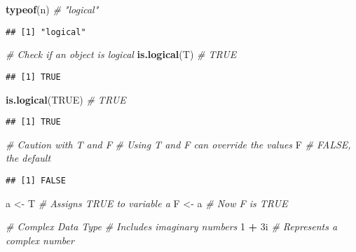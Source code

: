 \documentclass[
]{article}
\newenvironment{Shaded}{\begin{snugshade}}{\end{snugshade}}
\newcommand{\CommentTok}[1]{\textcolor[rgb]{0.56,0.35,0.01}{\textit{#1}}}
\newcommand{\ConstantTok}[1]{\textcolor[rgb]{0.56,0.35,0.01}{#1}}
\newcommand{\DataTypeTok}[1]{\textcolor[rgb]{0.13,0.29,0.53}{#1}}
\newcommand{\DecValTok}[1]{\textcolor[rgb]{0.00,0.00,0.81}{#1}}
\newcommand{\FunctionTok}[1]{\textcolor[rgb]{0.13,0.29,0.53}{\textbf{#1}}}
\newcommand{\NormalTok}[1]{#1}
\newcommand{\OtherTok}[1]{\textcolor[rgb]{0.56,0.35,0.01}{#1}}
\newcommand{\SpecialCharTok}[1]{\textcolor[rgb]{0.81,0.36,0.00}{\textbf{#1}}}
\begin{document}
\begin{Shaded}
\begin{Highlighting}[]
\FunctionTok{typeof}\NormalTok{(n)              }\CommentTok{\# "logical"}
\end{Highlighting}
\end{Shaded}

\begin{verbatim}
## [1] "logical"
\end{verbatim}

\begin{Shaded}
\begin{Highlighting}[]
\CommentTok{\# Check if an object is logical}
\FunctionTok{is.logical}\NormalTok{(T)          }\CommentTok{\# TRUE}
\end{Highlighting}
\end{Shaded}

\begin{verbatim}
## [1] TRUE
\end{verbatim}

\begin{Shaded}
\begin{Highlighting}[]
\FunctionTok{is.logical}\NormalTok{(}\ConstantTok{TRUE}\NormalTok{)       }\CommentTok{\# TRUE}
\end{Highlighting}
\end{Shaded}

\begin{verbatim}
## [1] TRUE
\end{verbatim}

\begin{Shaded}
\begin{Highlighting}[]
\CommentTok{\# Caution with T and F}
\CommentTok{\# Using T and F can override the values}
\NormalTok{F                     }\CommentTok{\# FALSE, the default}
\end{Highlighting}
\end{Shaded}

\begin{verbatim}
## [1] FALSE
\end{verbatim}

\begin{Shaded}
\begin{Highlighting}[]
\NormalTok{a }\OtherTok{\textless{}{-}}\NormalTok{ T                }\CommentTok{\# Assigns TRUE to variable a}
\NormalTok{F }\OtherTok{\textless{}{-}}\NormalTok{ a                }\CommentTok{\# Now F is TRUE}

\CommentTok{\# Complex Data Type}
\CommentTok{\# Includes imaginary numbers}
\DecValTok{1} \SpecialCharTok{+} \DecValTok{3}\DataTypeTok{i}                \CommentTok{\# Represents a complex number}
\end{Highlighting}
\end{Shaded}
\end{document}
